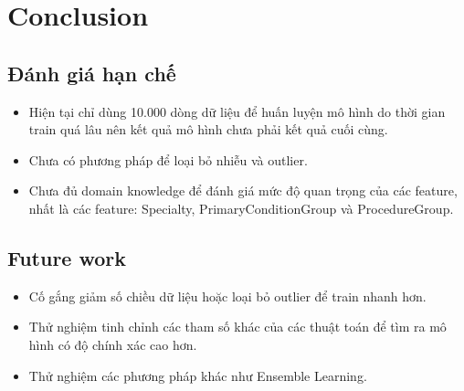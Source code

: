 \chapter{Conclusion}

\section{Đánh giá hạn chế}

\begin{itemize}
\item Hiện tại chỉ dùng 10.000 dòng dữ liệu để huấn luyện mô hình do thời gian train quá lâu nên kết quả mô hình chưa phải kết quả cuối cùng.
\item Chưa có phương pháp để loại bỏ nhiễu và outlier.
\item Chưa đủ domain knowledge để đánh giá mức độ quan trọng của các feature, nhất là các feature: Specialty, PrimaryConditionGroup và ProcedureGroup.
\end{itemize}

\section{Future work}

\begin{itemize}
\item Cố gắng giảm số chiều dữ liệu hoặc loại bỏ outlier để train nhanh hơn.
\item Thử nghiệm tinh chỉnh các tham số khác của các thuật toán để tìm ra mô hình có độ chính xác cao hơn.
\item Thử nghiệm các phương pháp khác như Ensemble Learning.
\end{itemize}